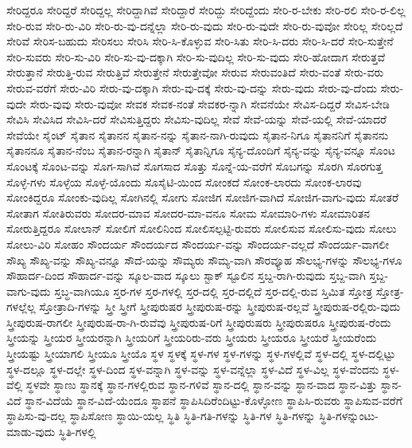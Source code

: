 {ಸೇರಿದ್ದರೂ
ಸೇರಿದ್ದರೆ
ಸೇರಿದ್ದಲ್ಲ
ಸೇರಿದ್ದಾಗಿವೆ
ಸೇರಿದ್ದಾರೆ
ಸೇರಿದ್ದು
ಸೇರಿದ್ದೆಂದು
ಸೇರಿ-ರ-ಬೇಕು
ಸೇರಿ-ರಲಿ
ಸೇರಿ-ರ-ಲಿಲ್ಲ
ಸೇರಿ-ರುವ
ಸೇರಿ-ರು-ವಿರಿ
ಸೇರಿ-ರು-ವು-ದನ್ನೆಲ್ಲಾ
ಸೇರಿ-ರು-ವುದು
ಸೇರಿ-ರು-ವುದೇ
ಸೇರಿ-ರು-ವುವೋ
ಸೇರಿಲ್ಲ
ಸೇರಿಲ್ಲದೆ
ಸೇರಿವೆ
ಸೇರಿಸ-ಬಹುದು
ಸೇರಿಸಲು
ಸೇರಿಸಿ
ಸೇರಿ-ಸಿ-ಕೊಳ್ಳುವ
ಸೇರಿ-ಸಿತು
ಸೇರಿ-ಸಿ-ದರು
ಸೇರಿ-ಸಿ-ದರೆ
ಸೇರಿ-ಸುತ್ತೇನೆ
ಸೇರಿ-ಸುವರು
ಸೇರಿ-ಸು-ವಿರಿ
ಸೇರಿ-ಸು-ವು-ದಕ್ಕಾಗಿ
ಸೇರಿ-ಸು-ವುದಿಲ್ಲ
ಸೇರಿ-ಸು-ವುದು
ಸೇರಿ-ಹೋದಾಗ
ಸೇರುತ್ತವೆ
ಸೇರುತ್ತಾನೆ
ಸೇರುತ್ತಿ-ರುವ
ಸೇರುತ್ತಿವೆ
ಸೇರುತ್ತೇನೆ
ಸೇರುತ್ತೇವೋ
ಸೇರುವ
ಸೇರುವಂತಿದೆ
ಸೇರು-ವಂತೆ
ಸೇರು-ವರು
ಸೇರುವ-ವರೆಗೆ
ಸೇರು-ವಿರಿ
ಸೇರು-ವು-ದಕ್ಕಾಗಿ
ಸೇರು-ವು-ದಕ್ಕೆ
ಸೇರು-ವು-ದನ್ನು
ಸೇರು-ವುದು
ಸೇರು-ವು-ದೆಂದು
ಸೇರು-ವುದೇ
ಸೇರು-ವುವು
ಸೇರು-ವುವೋ
ಸೇವಕ
ಸೇವಕ-ನಂತೆ
ಸೇವಕರ-ನ್ನಾಗಿ
ಸೇವನೆಯೇ
ಸೇವಿಸ-ದಿದ್ದರೆ
ಸೇವಿಸ-ಬೇಡಿ
ಸೇವಿಸಿ
ಸೇವಿಸಿದ
ಸೇವಿಸಿ-ದರೆ
ಸೇವಿಸುತ್ತಿದ್ದರು
ಸೇವಿಸು-ವುದಿಲ್ಲ
ಸೇವೆ
ಸೇವೆ-ಯನ್ನು
ಸೇವೆ-ಯಲ್ಲಿ
ಸೇವೆ-ಯಾದರೆ
ಸೇವೆಯೇ
ಸೈಂಟ್
ಸೈತಾನ
ಸೈತಾನನ
ಸೈತಾನ-ನನ್ನು
ಸೈತಾನ-ನಾಗಿ-ರುವುದು
ಸೈತಾನ-ನಿಗೂ
ಸೈತಾನನಿಗೆ
ಸೈತಾನನು
ಸೈತಾನನೂ
ಸೈತಾನ-ನೆಂಬ
ಸೈತಾನ-ರನ್ನಾಗಿ
ಸೈತಾನ್
ಸೈತಾನ್ನಿಗೂ
ಸೈನ್ಯ-ದೊಂದಿಗೆ
ಸೈನ್ಯ-ವನ್ನು
ಸೈನ್ಯ-ವನ್ನೂ
ಸೊಂಟ
ಸೊಂಟಕ್ಕೆ
ಸೊಂಟ-ವನ್ನು
ಸೊಗ-ಸಾಗಿವೆ
ಸೊಗಸಾದ
ಸೊತ್ತು
ಸೊನ್ನೆ-ಯ-ವರೆಗೆ
ಸೊಬಗನ್ನು
ಸೊರಗಿ
ಸೊರಗುತ್ತ
ಸೊಳ್ಳೆ-ಗಳು
ಸೊಳ್ಳೆಯ
ಸೊಳ್ಳೆ-ಯೊಂದು
ಸೊಸೈಟಿ-ಯಿಂದ
ಸೋಂಕದೆ
ಸೋಂಕ-ಲಾರದು
ಸೋಂಕ-ಲಾರವು
ಸೋಂಕಿದ್ದರೂ
ಸೋಂಕು-ವುದಿಲ್ಲ
ಸೋಗಿನಲ್ಲಿ
ಸೋಗು
ಸೋಜಿಗ
ಸೋಜಿಗ-ವಾಗಿದೆ
ಸೋಜಿಗ-ವಾಗು-ವುದು
ಸೋತರೆ
ಸೋತಾಗ
ಸೋತಿರುವರು
ಸೋದರ-ಮಾವ
ಸೋದರ-ಮಾ-ವನೂ
ಸೋಮ
ಸೋಮಾರಿ-ಗಳು
ಸೋಮಾರಿತನ
ಸೋರುತ್ತಿದ್ದರೂ
ಸೋಲಾನ್
ಸೋಲಿಗೆ
ಸೋಲಿನಿಂದ
ಸೋಲಿಸಲ್ಪಟ್ಟಿ-ರುವರು
ಸೋಲಿಸುವ
ಸೋಲಿಸು-ವುದು
ಸೋಲು
ಸೋಲು-ವಿರಿ
ಸೋಹಂ
ಸೌಂದರ್ಯ
ಸೌಂದರ್ಯದ
ಸೌಂದರ್ಯ-ವನ್ನು
ಸೌಂದರ್ಯ-ವಲ್ಲದೆ
ಸೌಂದರ್ಯ-ವಾಗಲೀ
ಸೌಖ್ಯ
ಸೌಖ್ಯ-ವನ್ನು
ಸೌಖ್ಯ-ವನ್ನೂ
ಸೌದೆ-ಯನ್ನು
ಸೌಮ್ಯರು
ಸೌಮ್ಯ-ವಾಗಿ
ಸೌರವ್ಯೂಹ
ಸೌಲಭ್ಯ-ಗಳನ್ನು
ಸೌಲಭ್ಯ-ಗಳೂ
ಸೌಹಾರ್ದ-ದಿಂದ
ಸೌಹಾರ್ದ-ವನ್ನು
ಸ್ಕೂಲ-ವಾದ
ಸ್ಕೂಲು
ಸ್ಟಾಕ್
ಸ್ಟೂಲಿನ
ಸ್ತಬ್ದ-ರಾಗಿ-ರುವುದು
ಸ್ತಬ್ದ-ವಾಗಿ
ಸ್ತಬ್ದ-ವಾಗು-ವುದು
ಸ್ತಬ್ಧ-ವಾಗಿಯೂ
ಸ್ತರ-ಗಳ
ಸ್ತರ-ಗಳಲ್ಲಿ
ಸ್ತರ-ದಲ್ಲಿ
ಸ್ತರ-ದಲ್ಲಿದೆ
ಸ್ತರ-ದಲ್ಲಿ-ರುವ
ಸ್ತಿಮಿತ
ಸ್ತೋತ್ರ
ಸ್ತೋತ್ರ-ಗಳಲ್ಲೆಲ್ಲ
ಸ್ತೋತ್ರಾದಿ-ಗಳನ್ನು
ಸ್ತ್ರೀ
ಸ್ತ್ರೀಗೆ
ಸ್ತ್ರೀಪುರುಷರ
ಸ್ತ್ರೀಪುರುಷ-ರನ್ನು
ಸ್ತ್ರೀಪುರುಷ-ರಲ್ಲವೆ
ಸ್ತ್ರೀಪುರುಷ-ರಲ್ಲಿರು-ವುದು
ಸ್ತ್ರೀಪುರುಷ-ರಾಗಲೀ
ಸ್ತ್ರೀಪುರುಷ-ರಾ-ಗಿ-ರುವೆವು
ಸ್ತ್ರೀಪುರುಷ-ರಿಗೆ
ಸ್ತ್ರೀಪುರುಷರು
ಸ್ತ್ರೀಪುರುಷರೂ
ಸ್ತ್ರೀಪುರುಷ-ರೆಂದು
ಸ್ತ್ರೀಯನ್ನು
ಸ್ತ್ರೀಯರ
ಸ್ತ್ರೀಯರನ್ನಾಗಿ
ಸ್ತ್ರೀಯರಿಗೆ
ಸ್ತ್ರೀಯರಿರು-ವರು
ಸ್ತ್ರೀಯರು
ಸ್ತ್ರೀಯರೂ
ಸ್ತ್ರೀಯರೆ
ಸ್ತ್ರೀಯರೆಂದು
ಸ್ತ್ರೀಯಷ್ಟು
ಸ್ತ್ರೀಯಾಗಲಿ
ಸ್ತ್ರೀಯೂ
ಸ್ತ್ರೀಯೊ
ಸ್ಥಳ
ಸ್ಥಳಕ್ಕೆ
ಸ್ಥಳ-ಗಳ
ಸ್ಥಳ-ಗಳನ್ನು
ಸ್ಥಳ-ಗಳಲ್ಲಿವೆ
ಸ್ಥಳ-ದಲ್ಲಿ
ಸ್ಥಳ-ದಲ್ಲಿಟ್ಟು
ಸ್ಥಳ-ದಲ್ಲೂ
ಸ್ಥಳ-ದಲ್ಲೇ
ಸ್ಥಳ-ದಿಂದ
ಸ್ಥಳ-ವನ್ನಾಗಿ
ಸ್ಥಳ-ವನ್ನು
ಸ್ಥಳ-ವನ್ನೆಲ್ಲಾ
ಸ್ಥಳ-ವಿದೆ
ಸ್ಥಳ-ವಿಲ್ಲ
ಸ್ಥಳ-ವೆಂದನು
ಸ್ಥಳ-ವೆಲ್ಲಿ
ಸ್ಥಳವೇ
ಸ್ಥಾಣು
ಸ್ಥಾನಕ್ಕೆ
ಸ್ಥಾನ-ಗಳಲ್ಲಿರುವ
ಸ್ಥಾನ-ಗಳಿವೆ
ಸ್ಥಾನ-ದಲ್ಲಿ
ಸ್ಥಾನ-ವನ್ನು
ಸ್ಥಾನ-ವಾದ
ಸ್ಥಾನ-ವಿತ್ತು
ಸ್ಥಾನ-ವಿದೆ
ಸ್ಥಾನ-ವಿದೆಯೆ
ಸ್ಥಾನ-ವಿದೆ-ಯೆಂದೂ
ಸ್ಥಾಪನೆ
ಸ್ಥಾಪಿಸಿದಿರೆಂದಿಟ್ಟು-ಕೊಳ್ಳೋಣ
ಸ್ಥಾಪಿಸಿ-ರುವರು
ಸ್ಥಾಪಿಸುವ-ವರೆಗೆ
ಸ್ಥಾಪಿಸು-ವು-ದಲ್ಲ
ಸ್ಥಾಪಿಸೋಣ
ಸ್ಥಾಯಿ-ಯಲ್ಲ
ಸ್ಥಿತಿ
ಸ್ಥಿತಿ-ಗತಿ-ಗಳನ್ನು
ಸ್ಥಿತಿ-ಗಳ
ಸ್ಥಿತಿ-ಗಳನ್ನು
ಸ್ಥಿತಿ-ಗಳನ್ನುಂಟು-ಮಾಡು-ವುದು
ಸ್ಥಿತಿ-ಗಳಲ್ಲಿ
}
